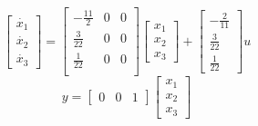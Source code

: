 \documentclass{article}
\begin{document}
\[
    \left[
        \begin{array}{c}
            \dot{x_1}\\
            \dot{x_2}\\
            \dot{x_3}
        \end{array}
    \right]=
    \left[
        \begin{array}{ccc}
            -\frac{11}{2} & 0 & 0\\
            \frac{3}{22} & 0 & 0\\
            \frac{1}{22} & 0 & 0\\
        \end{array}
    \right]
    \left[
        \begin{array}{c}
            x_1\\
            x_2\\
            x_3
        \end{array}
    \right]+
    \left[
        \begin{array}{c}
            -\frac{2}{11}\\
            \frac{3}{22}\\
            \frac{1}{22}
        \end{array}
    \right]u    
\]
\[
y=\left[
    \begin{array}{ccc}
        0 & 0 & 1
    \end{array}
\right]
\left[
    \begin{array}{c}
        x_1\\
        x_2\\
        x_3
    \end{array}
\right]    
\]
\end{document}
